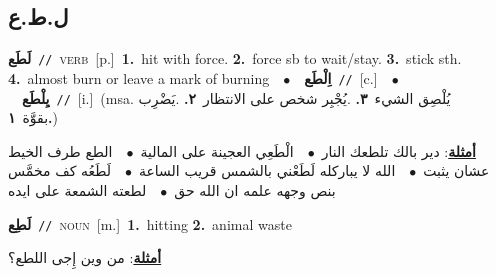 \documentclass[10pt,a4paper,twoside]{article} %
\begin{document}
\begin{multicols}{2}
\vspace{-3mm}
\subsection*{\color{blue}\foreignlanguage{arabic}{ل.ط.ع}\color{blue}{}} 

{\setlength\topsep{0pt}\textbf{\foreignlanguage{arabic}{لَطَع}}\ {\color{gray}\texttt{//}\color{black}}\ \textsc{verb}\ [p.]\ \textbf{1.}~hit with force.  \textbf{2.}~force sb to wait/stay.  \textbf{3.}~stick sth.  \textbf{4.}~almost burn  or leave a mark of burning\ \ $\bullet$\ \ \setlength\topsep{0pt}\textbf{\foreignlanguage{arabic}{اِلْطَع}}\ {\color{gray}\texttt{//}\color{black}}\ [c.]\ \ $\bullet$\ \ \setlength\topsep{0pt}\textbf{\foreignlanguage{arabic}{يِلْطَع}}\ {\color{gray}\texttt{//}\color{black}}\ [i.]\ \color{gray}(msa. \foreignlanguage{arabic}{يُلْصِق الشيء}~\foreignlanguage{arabic}{\textbf{٣.}}  .\foreignlanguage{arabic}{يُجْبِر شخص على الانتظار}~\foreignlanguage{arabic}{\textbf{٢.}}  .\foreignlanguage{arabic}{يَضْرِب بقوَّة}~\foreignlanguage{arabic}{\textbf{١.}})\color{black}\  \begin{flushright}\color{gray}\foreignlanguage{arabic}{\textbf{\underline{\foreignlanguage{arabic}{أمثلة}}}: دير بالك تلطعك النار\ $\bullet$\ \  الْطَعِي العجينة على المالية\ $\bullet$\ \  الطع طرف الخيط عشان يثبت\ $\bullet$\ \  الله لا يباركله لَطَعْني بالشمس قريب الساعة\ $\bullet$\ \  لَطَعُه كف مخمَّس بنص وجهه علمه ان الله حق\ $\bullet$\ \  لطعته الشمعة على ايده}\end{flushright}\color{black}} \vspace{2mm}

{\setlength\topsep{0pt}\textbf{\foreignlanguage{arabic}{لَطِع}}\ {\color{gray}\texttt{//}\color{black}}\ \textsc{noun}\ [m.]\ \textbf{1.}~hitting  \textbf{2.}~animal waste\  \begin{flushright}\color{gray}\foreignlanguage{arabic}{\textbf{\underline{\foreignlanguage{arabic}{أمثلة}}}: من وين إِجى اللطع؟}\end{flushright}\color{black}} \vspace{2mm}


\end{multicols}
\end{document}
